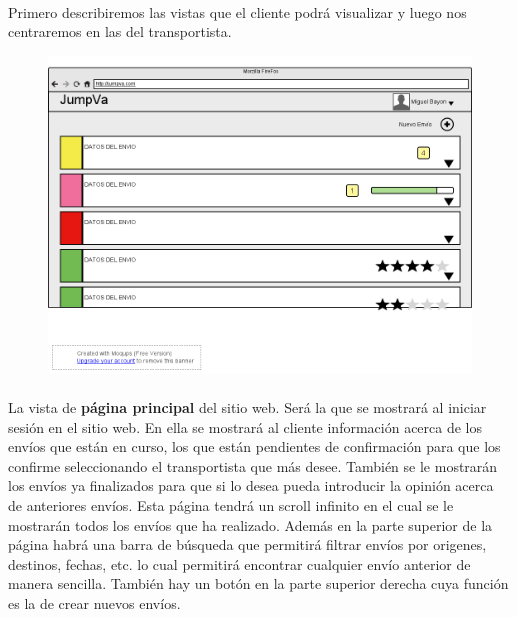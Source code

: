 \documentclass[10pt, a4paper,spanish]{article}
\begin{document}
			\paragraph{}
			Primero describiremos las vistas que el cliente podrá visualizar y luego nos centraremos en las del transportista.

			\begin{figure}[H]
				\centering
				\begin{minipage}[b]{0.8\textwidth}
					\includegraphics[width=\textwidth]{res/PaginaPrincipal.png}
				\end{minipage}
			\end{figure}

			\paragraph{}
			La vista de \textbf{página principal} del sitio web. Será la que se mostrará al iniciar sesión en el sitio web. En ella se mostrará al cliente información acerca de los envíos que están en curso, los que están pendientes de confirmación para que los confirme seleccionando el transportista que más desee. También se le mostrarán los envíos ya finalizados para que si lo desea pueda introducir la opinión acerca de anteriores envíos. Esta página tendrá un scroll infinito en el cual se le mostrarán todos los envíos que ha realizado. Además en la parte superior de la página habrá una barra de búsqueda que permitirá filtrar envíos por origenes, destinos, fechas, etc. lo cual permitirá encontrar cualquier envío anterior de manera sencilla. También hay un botón en la parte superior derecha cuya función es la de crear nuevos envíos.
\end{document}
